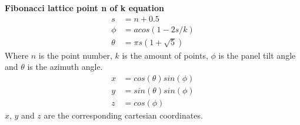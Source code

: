 \noindent \textbf{Fibonacci lattice point n of k equation}
\begin{align}
	s &= n + 0.5 \\
	\phi &= acos(1 - 2 s / k) \\
	\theta &= \pi s (1 + \sqrt{5})
\end{align}
Where $n$ is the point number, $k$ is the amount of points, $\phi$ is the panel tilt angle and $\theta$ is the azimuth angle.
\begin{align}
	x &= cos(\theta)sin(\phi)\\
	y &= sin(\theta)sin(\phi)\\
	z &= cos(\phi)
\end{align}
$x$, $y$ and $z$ are the corresponding cartesian coordinates.
\vspace{5mm}



